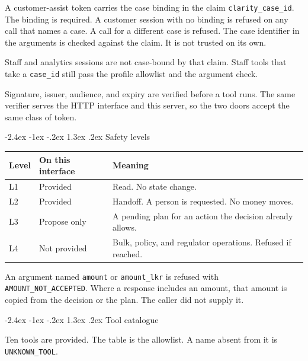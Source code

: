 \documentclass[11pt,a4paper]{article}
\makeatletter
\renewcommand\section{%
  \@startsection{section}{1}{\z@}%
    {-2.4ex \@plus -1ex \@minus -.2ex}%
    {1.3ex \@plus .2ex}%
    {\Large\sffamily\bfseries\color{hcNavy}}%
}
\newcommand{\code}[1]{\texttt{#1}}
\makeatother
\begin{document}
A customer-assist token carries the case binding in the claim \code{clarity\_case\_id}. The binding is required. A customer session with no binding is refused on any call that names a case. A call for a different case is refused. The case identifier in the arguments is checked against the claim. It is not trusted on its own.

Staff and analytics sessions are not case-bound by that claim. Staff tools that take a \code{case\_id} still pass the profile allowlist and the argument check.

Signature, issuer, audience, and expiry are verified before a tool runs. The same verifier serves the HTTP interface and this server, so the two doors accept the same class of token.

\section{Safety levels}

\begin{center}
\small
\begin{tabularx}{\textwidth}{@{}llX@{}}
\toprule
\textbf{Level} & \textbf{On this interface} & \textbf{Meaning} \\
\midrule
L1 & Provided & Read. No state change. \\
L2 & Provided & Handoff. A person is requested. No money moves. \\
L3 & Propose only & A pending plan for an action the decision already allows. \\
L4 & Not provided & Bulk, policy, and regulator operations. Refused if reached. \\
\bottomrule
\end{tabularx}
\end{center}

An argument named \code{amount} or \code{amount\_lkr} is refused with \code{AMOUNT\_NOT\_ACCEPTED}. Where a response includes an amount, that amount is copied from the decision or the plan. The caller did not supply it.

\section{Tool catalogue}
\label{sec:tools}

Ten tools are provided. The table is the allowlist. A name absent from it is \code{UNKNOWN\_TOOL}.
\end{document}

